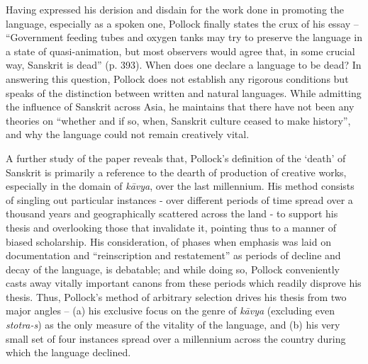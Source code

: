 Having expressed his derision and disdain for the work done in promoting the language, especially as a spoken one, Pollock finally states the crux of his essay – “Government feeding tubes and oxygen tanks may try to preserve the language in a state of quasi-animation, but most observers would agree that, in some crucial way, Sanskrit is dead” (p. 393). When does one declare a language to be dead? In answering this question, Pollock does not establish any rigorous conditions but speaks of the distinction between written and natural languages. While admitting the influence of Sanskrit across Asia, he maintains that there have not been any theories on “whether and if so, when, Sanskrit culture ceased to make history”, and why the language could not remain creatively vital.

A further study of the paper reveals that, Pollock’s definition of the ‘death’ of Sanskrit is primarily a reference to the dearth of production of creative works, especially in the domain of {\sl kāvya}, over the last millennium. His method consists of singling out particular instances - over different periods of time spread over a thousand years and geographically scattered across the land - to support his thesis and overlooking those that invalidate it, pointing thus to a manner of biased scholarship. His consideration, of phases when emphasis was laid on documentation and “reinscription and restatement” as periods of decline and decay of the language, is debatable; and while doing so, Pollock conveniently casts away vitally important canons from these periods which readily disprove his thesis. Thus, Pollock’s method of arbitrary selection drives his thesis from two major angles – (a) his exclusive focus on the genre of {\sl kāvya} (excluding even {\sl stotra-s}) as the only measure of the vitality of the language, and (b) his very small set of four instances spread over a millennium across the country during which the language declined.

